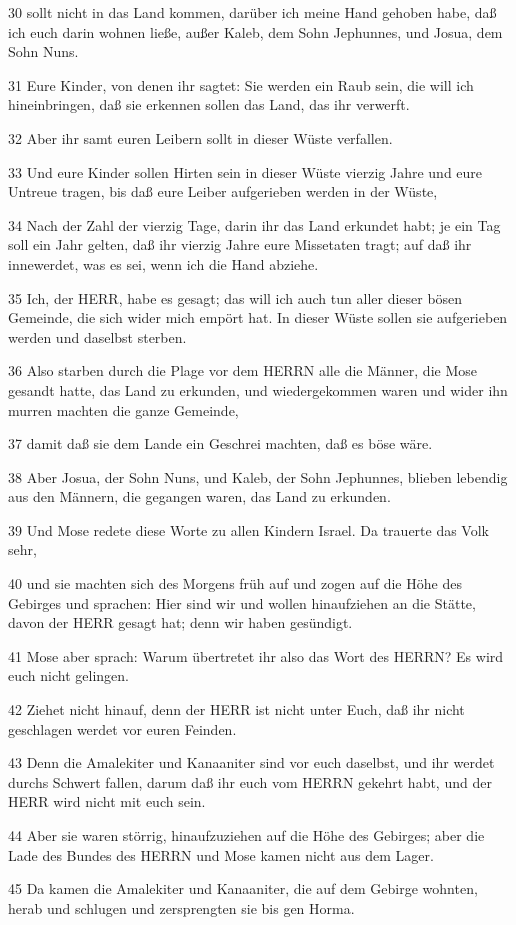 \par 30 sollt nicht in das Land kommen, darüber ich meine Hand gehoben habe, daß ich euch darin wohnen ließe, außer Kaleb, dem Sohn Jephunnes, und Josua, dem Sohn Nuns.
\par 31 Eure Kinder, von denen ihr sagtet: Sie werden ein Raub sein, die will ich hineinbringen, daß sie erkennen sollen das Land, das ihr verwerft.
\par 32 Aber ihr samt euren Leibern sollt in dieser Wüste verfallen.
\par 33 Und eure Kinder sollen Hirten sein in dieser Wüste vierzig Jahre und eure Untreue tragen, bis daß eure Leiber aufgerieben werden in der Wüste,
\par 34 Nach der Zahl der vierzig Tage, darin ihr das Land erkundet habt; je ein Tag soll ein Jahr gelten, daß ihr vierzig Jahre eure Missetaten tragt; auf daß ihr innewerdet, was es sei, wenn ich die Hand abziehe.
\par 35 Ich, der HERR, habe es gesagt; das will ich auch tun aller dieser bösen Gemeinde, die sich wider mich empört hat. In dieser Wüste sollen sie aufgerieben werden und daselbst sterben.
\par 36 Also starben durch die Plage vor dem HERRN alle die Männer, die Mose gesandt hatte, das Land zu erkunden, und wiedergekommen waren und wider ihn murren machten die ganze Gemeinde,
\par 37 damit daß sie dem Lande ein Geschrei machten, daß es böse wäre.
\par 38 Aber Josua, der Sohn Nuns, und Kaleb, der Sohn Jephunnes, blieben lebendig aus den Männern, die gegangen waren, das Land zu erkunden.
\par 39 Und Mose redete diese Worte zu allen Kindern Israel. Da trauerte das Volk sehr,
\par 40 und sie machten sich des Morgens früh auf und zogen auf die Höhe des Gebirges und sprachen: Hier sind wir und wollen hinaufziehen an die Stätte, davon der HERR gesagt hat; denn wir haben gesündigt.
\par 41 Mose aber sprach: Warum übertretet ihr also das Wort des HERRN? Es wird euch nicht gelingen.
\par 42 Ziehet nicht hinauf, denn der HERR ist nicht unter Euch, daß ihr nicht geschlagen werdet vor euren Feinden.
\par 43 Denn die Amalekiter und Kanaaniter sind vor euch daselbst, und ihr werdet durchs Schwert fallen, darum daß ihr euch vom HERRN gekehrt habt, und der HERR wird nicht mit euch sein.
\par 44 Aber sie waren störrig, hinaufzuziehen auf die Höhe des Gebirges; aber die Lade des Bundes des HERRN und Mose kamen nicht aus dem Lager.
\par 45 Da kamen die Amalekiter und Kanaaniter, die auf dem Gebirge wohnten, herab und schlugen und zersprengten sie bis gen Horma.

